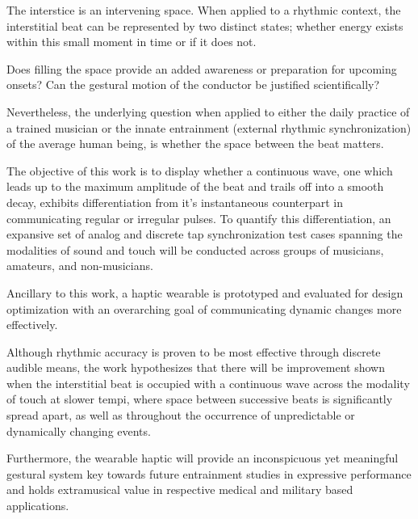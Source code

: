 
\setlength{\parskip}{1em}
\setlength{\parindent}{0em}

\noindent
\listoftodos
{}

The interstice is an intervening space. When applied to a rhythmic context, the interstitial beat can be represented by two distinct states; whether energy exists within this small moment in time or if it does not. 

Does filling the space provide an added awareness or preparation for upcoming onsets? Can the gestural motion of the conductor be justified scientifically?

Nevertheless, the underlying question when applied to either the daily practice of a trained musician or the innate entrainment (external rhythmic synchronization) of the average human being, is whether the space between the beat matters.

The objective of this work is to display whether a continuous wave, one which leads up to the maximum amplitude of the beat and trails off into a smooth decay, exhibits differentiation from it's instantaneous counterpart in communicating regular or irregular pulses. To quantify this differentiation, an expansive set of analog and discrete tap synchronization test cases spanning the modalities of sound and touch will be conducted across groups of musicians, amateurs, and non-musicians.

Ancillary to this work, a haptic wearable is prototyped and evaluated for design optimization with an overarching goal of communicating dynamic changes more effectively.

Although rhythmic accuracy is proven to be most effective through discrete audible means, the work hypothesizes that there will be improvement shown when the interstitial beat is occupied with a continuous wave across the modality of touch at slower tempi, where space between successive beats is significantly spread apart, as well as throughout the occurrence of unpredictable or dynamically changing events. 

Furthermore, the wearable haptic will provide an inconspicuous yet meaningful gestural system key towards future entrainment studies in expressive performance and holds extramusical value in respective medical and military based applications.
